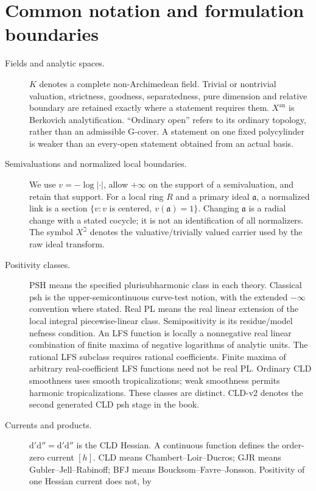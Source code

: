 \documentclass[11pt,a4paper]{article}
\theoremstyle{definition}
\theoremstyle{remark}
\newcommand{\PSH}{\mathrm{PSH}}
\newcommand{\rd}{\mathrm d}
\newcommand{\dprime}{\rd'}
\newcommand{\ddprime}{\rd''}
\newcommand{\dprimeddprime}{\dprime\ddprime}
\begin{document}
\section*{Common notation and formulation boundaries}
\begin{description}
\item[Fields and analytic spaces.]
\(K\) denotes a complete non-Archimedean field. Trivial or nontrivial valuation,
strictness, goodness, separatedness, pure dimension and relative boundary
are retained exactly where a statement requires them. \(X^{\mathrm{an}}\)
is Berkovich analytification. ``Ordinary open'' refers to its ordinary
topology, rather than an admissible G-cover. A statement on one fixed
polycylinder is weaker than an every-open statement obtained from an actual
basis.
\item[Semivaluations and normalized local boundaries.]
We use \(v=-\log|\cdot|\), allow \(+\infty\) on the support of a
semivaluation, and retain that support. For a local ring \(R\) and a primary
ideal \(\mathfrak a\), a normalized link is a section
\(\{v:v\text{ is centered},\ v(\mathfrak a)=1\}\).
Changing \(\mathfrak a\) is a radial change with a stated cocycle; it is not
an identification of all normalizers. The symbol \(X^\beth\) denotes the
valuative/trivially valued carrier used by the raw ideal transform.
\item[Positivity classes.]
\(\PSH\) means the specified plurisubharmonic class in each theory.
Classical psh is the upper-semicontinuous curve-test notion, with the
extended \(-\infty\) convention where stated. Real PL means the real linear
extension of the local integral piecewise-linear class. Semipositivity is
its residue/model nefness condition. An LFS function is locally a
nonnegative real linear combination of finite maxima of negative logarithms
of analytic units. The rational LFS subclass requires rational
coefficients. Finite maxima of arbitrary real-coefficient LFS functions
need not be real PL.
Ordinary CLD smoothness uses smooth tropicalizations; weak smoothness
permits harmonic tropicalizations. These classes are distinct.
CLD-v2 denotes the second generated CLD psh stage in the book.
\item[Currents and products.]
\(\dprimeddprime=\dprime\ddprime\) is the CLD Hessian. A continuous
function defines the order-zero current \([h]\). CLD means
Chambert--Loir--Ducros; GJR means Gubler--Jell--Rabinoff; BFJ means
Boucksom--Favre--Jonsson. Positivity of one Hessian current does not, by

\end{description}
\end{document}
